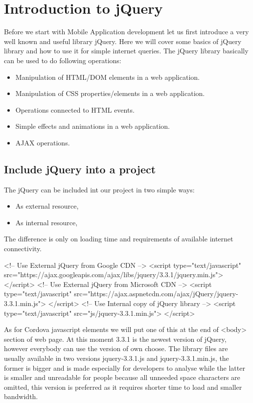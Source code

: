 \chapter{Introduction to jQuery }

Before we start with Mobile Application development let us first introduce a very well known and useful library jQuery. Here we will cover some basics of jQuery library and how to use it for simple internet queries. The jQuery library basically can be used to do following operations:
\begin{itemize}
\item Manipulation of HTML/DOM elements in a web application.
\item Manipulation of CSS properties/elements in a web application.
\item Operations connected to HTML events.
\item Simple effects and animations in a web application.
\item AJAX operations.
\end{itemize}



\section{Include jQuery into a project}
The jQuery can be included int our project in two simple ways:
\begin{itemize}
\item As external resource,
\item As internal resource,
\end{itemize}

The difference is only on loading time and requirements of available internet connectivity.
\begin{html}
<!-- Use External jQuery from Google CDN -->
<script type="text/javascript"
    src="https://ajax.googleapis.com/ajax/libs/jquery/3.3.1/jquery.min.js">
</script>
<!-- Use External jQuery from Microsoft CDN -->
<script type="text/javascript"
    src="https://ajax.aspnetcdn.com/ajax/jQuery/jquery-3.3.1.min.js">
</script>
<!-- Use Internal copy of jQuery library -->
<script type="text/javascript"
    src="js/jquery-3.3.1.min.js">
</script>
\end{html}
As for Cordova javascript elements we will put one of this at the end of <body> section of web page. At this moment 3.3.1 is the newest version of jQuery, however everybody can use the version of own choose. The library files are usually available in two versions jquery-3.3.1.js and jquery-3.3.1.min.js, the former is bigger and is made especially for developers to analyse while the latter is smaller and unreadable for people because all unneeded space characters are omitted, this version is preferred as it requires shorter time to load and smaller bandwidth.

